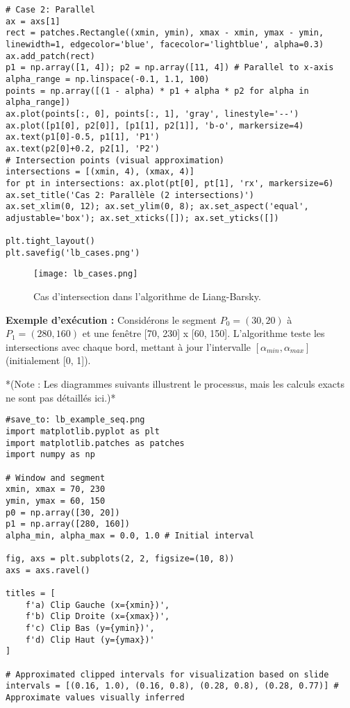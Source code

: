 \documentclass{article}
\begin{document}
{\begin{verbatim}
# Case 2: Parallel
ax = axs[1]
rect = patches.Rectangle((xmin, ymin), xmax - xmin, ymax - ymin, linewidth=1, edgecolor='blue', facecolor='lightblue', alpha=0.3)
ax.add_patch(rect)
p1 = np.array([1, 4]); p2 = np.array([11, 4]) # Parallel to x-axis
alpha_range = np.linspace(-0.1, 1.1, 100)
points = np.array([(1 - alpha) * p1 + alpha * p2 for alpha in alpha_range])
ax.plot(points[:, 0], points[:, 1], 'gray', linestyle='--')
ax.plot([p1[0], p2[0]], [p1[1], p2[1]], 'b-o', markersize=4)
ax.text(p1[0]-0.5, p1[1], 'P1')
ax.text(p2[0]+0.2, p2[1], 'P2')
# Intersection points (visual approximation)
intersections = [(xmin, 4), (xmax, 4)]
for pt in intersections: ax.plot(pt[0], pt[1], 'rx', markersize=6)
ax.set_title('Cas 2: Parallèle (2 intersections)')
ax.set_xlim(0, 12); ax.set_ylim(0, 8); ax.set_aspect('equal', adjustable='box'); ax.set_xticks([]); ax.set_yticks([])

plt.tight_layout()
plt.savefig('lb_cases.png')
\end{verbatim}

\begin{figure}[H]
\centering
\texttt{[image: lb\_cases.png]}
\caption{Cas d'intersection dans l'algorithme de Liang-Barsky.}
\label{fig:lb_cases}
\end{figure}

\textbf{Exemple d'exécution :} Considérons le segment $P_0=(30, 20)$ à $P_1=(280, 160)$ et une fenêtre [70, 230] x [60, 150]. L'algorithme teste les intersections avec chaque bord, mettant à jour l'intervalle $[\alpha_{min}, \alpha_{max}]$ (initialement [0, 1]).

*(Note : Les diagrammes suivants illustrent le processus, mais les calculs exacts ne sont pas détaillés ici.)*

\begin{verbatim}
#save_to: lb_example_seq.png
import matplotlib.pyplot as plt
import matplotlib.patches as patches
import numpy as np

# Window and segment
xmin, xmax = 70, 230
ymin, ymax = 60, 150
p0 = np.array([30, 20])
p1 = np.array([280, 160])
alpha_min, alpha_max = 0.0, 1.0 # Initial interval

fig, axs = plt.subplots(2, 2, figsize=(10, 8))
axs = axs.ravel()

titles = [
    f'a) Clip Gauche (x={xmin})',
    f'b) Clip Droite (x={xmax})',
    f'c) Clip Bas (y={ymin})',
    f'd) Clip Haut (y={ymax})'
]

# Approximated clipped intervals for visualization based on slide
intervals = [(0.16, 1.0), (0.16, 0.8), (0.28, 0.8), (0.28, 0.77)] # Approximate values visually inferred


\end{verbatim}}
\end{document}
